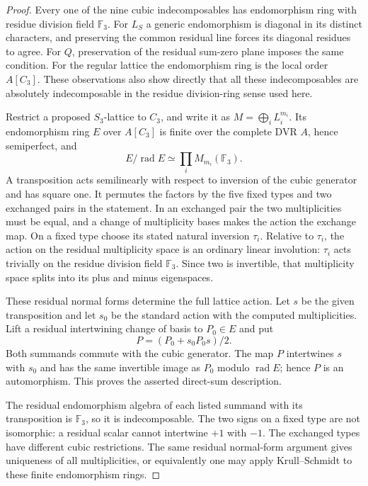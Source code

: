 \begin{proof}
Every one of the nine cubic indecomposables has endomorphism
ring with residue division field $\mathbb F_3$.
For $L_S$ a generic endomorphism is diagonal in its distinct
characters, and preserving the common residual line forces
its diagonal residues to agree. For $Q$, preservation of the
residual sum-zero plane imposes the same condition.
For the regular lattice the endomorphism ring is the local
order $A[C_3]$. These observations also show directly that
all these indecomposables are absolutely indecomposable in
the residue division-ring sense used here.

Restrict a proposed $S_3$-lattice to $C_3$, and write it as
$M=\bigoplus_i L_i^{m_i}$. Its endomorphism ring $E$ over
$A[C_3]$ is finite over the complete DVR $A$, hence semiperfect,
and
\[
          E/\operatorname{rad}E
             \simeq\prod_i M_{m_i}(\mathbb F_3).
\]
A transposition acts semilinearly with respect to inversion
of the cubic generator and has square one. It permutes the
factors by the five fixed types and two exchanged pairs in
the statement. In an exchanged pair the two multiplicities
must be equal, and a change of multiplicity bases makes the
action the exchange map. On a fixed type choose its stated
natural inversion $\tau_i$. Relative to $\tau_i$, the action
on the residual multiplicity space is an ordinary linear
involution: $\tau_i$ acts trivially on the residue division
field $\mathbb F_3$. Since two is invertible, that multiplicity
space splits into its plus and minus eigenspaces.

These residual normal forms determine the full lattice
action. Let $s$ be the
given transposition and let $s_0$ be the standard action
with the computed multiplicities. Lift a residual
intertwining change of basis to $P_0\in E$ and put
\[
                    P=(P_0+s_0P_0s)/2.
\]
Both summands commute with the cubic generator. The map
$P$ intertwines $s$ with $s_0$ and has the same invertible
image as $P_0$ modulo $\operatorname{rad}E$; hence $P$ is an
automorphism. This proves the asserted direct-sum description.

The residual endomorphism algebra of each listed summand
with its transposition is $\mathbb F_3$, so it is
indecomposable. The two signs on a fixed type are not
isomorphic: a residual scalar cannot intertwine $+1$ with
$-1$. The exchanged types have different cubic restrictions.
The same residual normal-form argument gives uniqueness of
all multiplicities, or equivalently one may apply
Krull--Schmidt to these finite endomorphism rings.
\end{proof}

